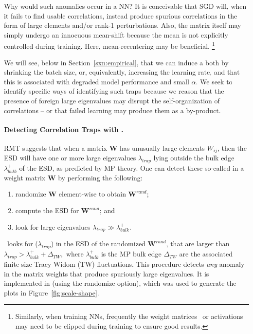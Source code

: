 Why would such anomalies occur in a NN?
It is conceivable that SGD will, when it fails to find usable correlations, instead
produce spurious
correlations in the form of large elements and/or rank-1 perturbations.
Also, the matrix itself may simply undergo an innocuous  mean-shift because the
mean is not explicitly controlled during training. Here,  mean-recentering may be beneficial.
\footnote{Similarly, when training NNs, frequently the weight matrices~\cite{baskin2021} or activations~\cite{choi2018_TR}
may need to be clipped during training to ensure good results.}

We will see, below in Section~\ref{sxn:empirical}, that we can induce a \CorrelationTrap both by shrinking the batch 
size, or, equivalently, increasing the learning rate, and that this is associated with degraded model performance
and small $\alpha$.
We seek to identify specific ways of identifying such traps because we 
reason that the presence of foreign large eigenvalues may disrupt the self-organization of correlations – or that failed learning may produce them as a by-product.

\paragraph{Detecting Correlation Traps with \RMT.}

RMT suggests that when a matrix $\mathbf{W}$ has unusually large elements $W_{ij}$, then the ESD will have one or more large eigenvalues $\lambda_{trap}$ lying outside the bulk edge $\lambda^{+}_{bulk}$ of the ESD, as predicted by MP theory. 
One can detect these so-called \CorrelationTraps in a weight matrix $\mathbf{W}$ by performing the following:
\begin{enumerate}
\item randomize $\mathbf{W}$ element-wise to obtain $\mathbf{W}^{rand}$;
\item compute the ESD for $\mathbf{W}^{rand}$; and
\item look for large eigenvalues $\lambda_{trap}\gg\lambda^{+}_{bulk}$.
\end{enumerate}
\WW~looks for \CorrelationTraps ($\lambda_{trap}$) in the ESD of the randomized $\mathbf{W}^{rand}$, that are larger than 
$ \lambda_{trap}>\lambda_{bulk}^{+}+\Delta_{TW} , $ 
where 
$\lambda^{+}_{bulk}$ is the MP bulk edge $\Delta_{TW}$ are the associated finite-size Tracy Widom (TW) fluctuations. 
This procedure detects \emph{any} anomaly in the matrix weights that produce spuriously large eigenvalues. 
It is implemented in \WW (using the randomize option), which was used to generate the plots in Figure~\ref{fig:scale-shape}.

